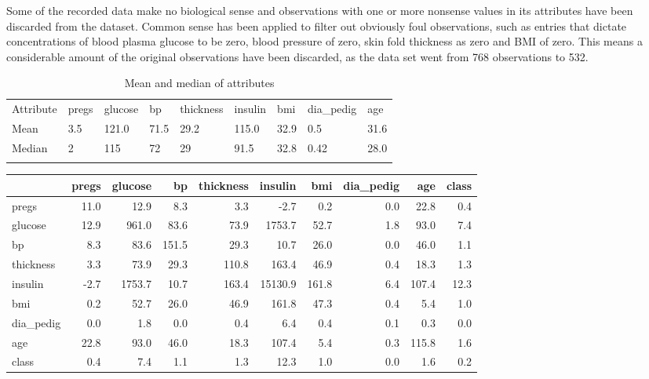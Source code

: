 Some of the recorded data make no biological sense and observations with one or
more nonsense values in its attributes have been discarded from the dataset.
Common sense has been applied to filter out obviously foul observations, such
as entries that dictate concentrations of blood plasma glucose to be zero, blood
pressure of zero, skin fold thickness as zero and BMI of zero. This means a
considerable amount of the original observations have been discarded, as the
data set went from 768 observations to 532.
\bigskip

\begin{table}[]
\centering
\caption{Mean and median of attributes}
\label{my-label}
\begin{tabular}{lllllllll}
\cline{1-1}
\multicolumn{1}{|l|}{Attribute} & pregs & glucose & bp   & thickness & insulin & bmi  & dia\_pedig & age  \\ \cline{1-1}
\multicolumn{1}{|l|}{Mean}      & 3.5   & 121.0   & 71.5 & 29.2      & 115.0   & 32.9 & 0.5        & 31.6 \\ \cline{1-1}
\multicolumn{1}{|l|}{Median}    & 2     & 115     & 72   & 29        & 91.5    & 32.8 & 0.42       & 28.0 \\ \cline{1-1}
                                                       &       &         &      &           &         &      &            &      \\ \hline
\end{tabular}
\end{table}

\begin{tabular}{lrrrrrrrrr}
\toprule
\caption{Covariance matrix}
{} &  pregs &  glucose &     bp &  thickness &  insulin &    bmi &  dia\_pedig &    age &  class \\
\midrule
pregs     &   11.0 &     12.9 &    8.3 &        3.3 &     -2.7 &    0.2 &        0.0 &   22.8 &    0.4 \\
glucose   &   12.9 &    961.0 &   83.6 &       73.9 &   1753.7 &   52.7 &        1.8 &   93.0 &    7.4 \\
bp        &    8.3 &     83.6 &  151.5 &       29.3 &     10.7 &   26.0 &        0.0 &   46.0 &    1.1 \\
thickness &    3.3 &     73.9 &   29.3 &      110.8 &    163.4 &   46.9 &        0.4 &   18.3 &    1.3 \\
insulin   &   -2.7 &   1753.7 &   10.7 &      163.4 &  15130.9 &  161.8 &        6.4 &  107.4 &   12.3 \\
bmi       &    0.2 &     52.7 &   26.0 &       46.9 &    161.8 &   47.3 &        0.4 &    5.4 &    1.0 \\
dia\_pedig &    0.0 &      1.8 &    0.0 &        0.4 &      6.4 &    0.4 &        0.1 &    0.3 &    0.0 \\
age       &   22.8 &     93.0 &   46.0 &       18.3 &    107.4 &    5.4 &        0.3 &  115.8 &    1.6 \\
class     &    0.4 &      7.4 &    1.1 &        1.3 &     12.3 &    1.0 &        0.0 &    1.6 &    0.2 \\
\bottomrule
\end{tabular}
